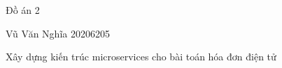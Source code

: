 Đồ án 2




Vũ Văn Nghĩa 20206205







Xây dựng kiến trúc microservices cho bài toán hóa đơn điện tử


 